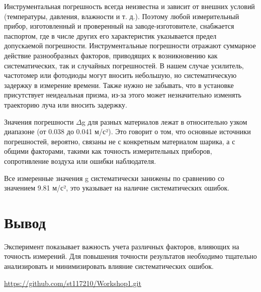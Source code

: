 Инструментальная погрешность всегда неизвестна и зависит от внешних условий (температуры, давления, влажности и т. д.). Поэтому любой измерительный прибор, изготовленный и проверенный на заводе-изготовителе, снабжается паспортом, где в числе других
его характеристик указывается предел допускаемой погрешности. Инструментальные погрешности отражают суммарное действие разнообразных факторов, приводящих к возникновению как систематических, так и случайных погрешностей. В нашем случае усилитель, частотомер или фотодиоды могут вносить небольшую, но систематическую задержку в измерение времени. Также нужно не забывать, что в установке присутствует неидеальная призма, из-за этого может незначительно изменять траекторию луча или вносить задержку.

Значения погрешности $\Delta$g для разных материалов лежат в относительно узком диапазоне (от 0.038 до 0.041 м/с²). Это говорит о том, что основные источники погрешностей, вероятно, связаны не с конкретным материалом шарика, а с общими факторами, такими как точность измерительных приборов, сопротивление воздуха или ошибки наблюдателя.

Все измеренные значения g систематически занижены по сравнению со значением 9.81 м/с², это указывает на наличие систематических ошибок.

\section{Вывод}
Эксперимент показывает важность учета различных факторов, влияющих на точность измерений. Для повышения точности результатов необходимо тщательно анализировать и минимизировать влияние систематических ошибок.
\begin{thebibliography}{9}

\url{https://github.com/st117210/Workshop1.git}  

\end{thebibliography}
\clearpage
\appendix